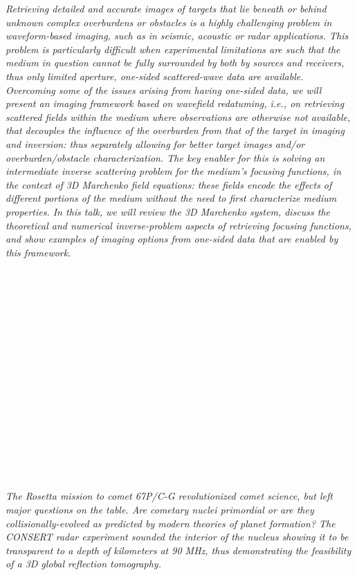 \begin{multicols}{2}
      \textit{Retrieving detailed and accurate images of targets that lie beneath or behind unknown complex overburdens or obstacles is a highly challenging problem in waveform-based imaging, such as in seismic, acoustic or radar applications. This problem is particularly difficult when experimental limitations are such that the medium in question cannot be fully surrounded by both by sources and receivers, thus only limited aperture, one-sided  scattered-wave data are available. Overcoming some of the issues arising from having one-sided data, we will present an imaging framework based on wavefield redatuming, i.e., on retrieving scattered fields within the medium where observations are otherwise not available, that decouples the influence of the overburden from that of the target in imaging and inversion: thus separately allowing for better target images and/or overburden/obstacle characterization.  The key enabler for this is solving an intermediate inverse scattering problem for the medium’s focusing functions, in the context of 3D Marchenko field equations: these fields encode the effects of different portions of the medium without the need to first characterize medium properties. In this talk, we will review the 3D Marchenko system, discuss the theoretical and numerical inverse-problem aspects of retrieving focusing functions, and show examples of imaging options from one-sided data that are enabled by this framework. }\\
\\ 
        \\
        \\\\
        \\
        \\\\
        \\
        \\\\
        \\
        \\\\
        \\
        \\\\
\\
      \textit{The Rosetta mission to comet 67P/C-G revolutionized comet science, but left major questions on the table. Are cometary nuclei primordial or are they collisionally-evolved as predicted by modern theories of planet formation? The CONSERT radar experiment sounded the interior of the nucleus showing it to be transparent to a depth of kilometers at 90 MHz, thus demonstrating the feasibility of a 3D global reflection tomography.
}
\end{multicols}
